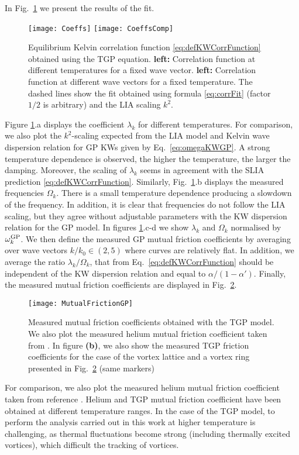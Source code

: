 \documentclass[sn-mathphys]{sn-jnl}%
\begin{document}
In Fig.~\ref{fig:coeff} we present the results of the fit.
\begin{figure}[h!]%
    \centering
    \texttt{[image: Coeffs]}
    \texttt{[image: CoeffsComp]}
    \caption{Equilibrium Kelvin correlation function \eqref{eq:defKWCorrFunction} obtained using the TGP equation. \textbf{left:} Correlation function at different temperatures for a fixed wave vector. \textbf{left:} Correlation function at different wave vectors for a fixed temperature. The dashed lines show the fit obtained using formula \eqref{eq:corrFit} (factor $1/2$ is arbitrary) and the LIA scaling $k^2$.}\label{fig:coeff}
\end{figure}
Figure  \ref{fig:coeff}.a displays the coefficient $\lambda_k$ for different temperatures. For comparison, we also plot the $k^2$-scaling expected from the LIA model and Kelvin wave dispersion relation for GP KWs given by Eq.~\eqref{eq:omegaKWGP}. A strong temperature dependence is observed, the higher the temperature, the larger the damping. Moreover, the scaling of $\lambda_k$ seems in agreement with the SLIA prediction \eqref{eq:defKWCorrFunction}. Similarly, Fig.~\ref{fig:coeff}.b displays the measured frequencies $\Omega_k$. There is a small temperature dependence producing a slowdown of the frequency. In addition, it is clear that frequencies do not follow the LIA scaling, but they agree without adjustable parameters with the KW dispersion relation for the GP model. In figures \ref{fig:coeff}.c-d we show $\lambda_k$ and $\Omega_k$ normalised by $\omega_k^{\rm GP}$. We then define the measured GP mutual friction coefficients by averaging over wave vectors $k/k_0\in(2,5)$ where curves are relatively flat. In addition, we average the ratio $\lambda_k/\Omega_k$, that from Eq.~\eqref{eq:defKWCorrFunction} should be independent of the KW dispersion relation and equal to $\alpha/(1-\alpha')$. Finally, the measured mutual friction coefficients are displayed in Fig.~\ref{fig:mutualFriction}.
\begin{figure}[h]%
    \centering
    \texttt{[image: MutualFrictionGP]}
    \caption{Measured mutual friction coefficients obtained with the TGP model. We also plot the measured helium mutual friction coefficient taken from \cite{HeliumProp_Donelly_Barenghi}. In figure \textbf{(b)}, we also show the measured TGP friction coefficients for the case of the vortex lattice and a vortex ring presented in Fig.~\ref{fig:mutualFriction} (same markers)}\label{fig:mutualFriction}
\end{figure}
For comparison, we also plot the measured helium mutual friction coefficient taken from reference \cite{HeliumProp_Donelly_Barenghi}. Helium and TGP mutual friction coefficient have been obtained at different temperature ranges. In the case of the TGP model, to perform the analysis carried out in this work at higher temperature is challenging, as thermal fluctuations become strong (including thermally excited vortices), which difficult the tracking of vortices.
\end{document}
